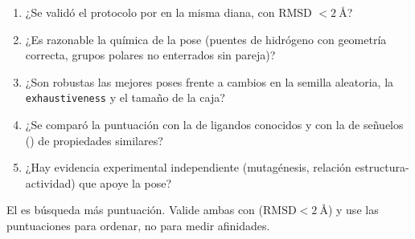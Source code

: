 \begin{cuidado}
\begin{enumerate}
  \item ¿Se validó el protocolo por  en la misma diana, con RMSD $<\SI{2}{\angstrom}$?
  \item ¿Es razonable la química de la pose (puentes de hidrógeno con geometría correcta, grupos polares no enterrados sin pareja)?
  \item ¿Son robustas las mejores poses frente a cambios en la semilla aleatoria, la \texttt{exhaustiveness} y el tamaño de la caja?
  \item ¿Se comparó la puntuación con la de ligandos conocidos y con la de señuelos () de propiedades similares?
  \item ¿Hay evidencia experimental independiente (mutagénesis, relación estructura-actividad) que apoye la pose?
\end{enumerate}
\end{cuidado}

\begin{ideaclave}
El  es búsqueda más puntuación. Valide ambas con  ($\mathrm{RMSD}<\SI{2}{\angstrom}$) y use las puntuaciones para ordenar, no para medir afinidades.
\end{ideaclave}

